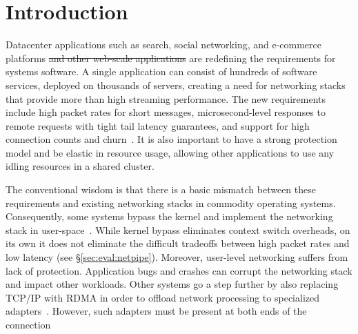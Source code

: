 
\section{Introduction}
\label{sec:intro}


Datacenter applications such as search, social networking, and
e-commerce platforms \sout{and other web-scale applications}  are redefining the requirements for systems
software. A single application can consist of hundreds of software
services, deployed on thousands of servers, creating a need for
networking stacks that provide more than high streaming performance.
The new requirements include high packet rates for short messages,
microsecond-level responses to remote requests with tight tail latency
guarantees, and support for high connection counts and
churn~\cite{Atikoglu:2012:WAL,DBLP:journals/cacm/DeanB13,DBLP:conf/nsdi/NishtalaFGKLLMPPSSTV13}.
It is also important to have a strong protection model and be elastic
in resource usage, allowing other applications to use any idling
resources in a shared
cluster. %

The conventional wisdom is that there is a basic mismatch between
these requirements and existing networking stacks in commodity
operating systems. Consequently, some systems bypass the kernel and
implement the networking stack in
user-space~\cite{jeong2014mtcp,DBLP:conf/cloud/KapoorPTVV12,sandstorm,openonload,DBLP:conf/sigcomm/ThekkathNML93}.
While kernel bypass eliminates context switch overheads, on its own it
does not eliminate the difficult tradeoffs between high packet rates
and low latency (see \S\ref{sec:eval:netpipe}). Moreover, user-level
networking suffers from lack of protection. Application bugs and
crashes can corrupt the networking stack and impact other workloads.
Other systems go a step further by also replacing TCP/IP with RDMA in
order to offload network processing to specialized
adapters~\cite{dragojevic14farm,DBLP:conf/icpp/JoseSLZHWIOWSP11,mitchell:rdma,DBLP:conf/sosp/OngaroRSOR11}.
However, such adapters must be present at both ends of the connection


